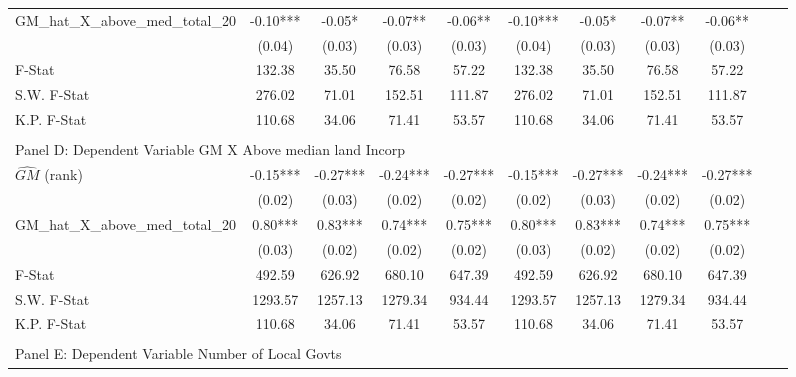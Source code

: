 \begin{table}[htbp]
\begin{threeparttable}
\begin{tabular}{l*{10}{c}}
\addlinespace
GM\_hat\_X\_above\_med\_total\_20&      -0.10***&      -0.05*  &      -0.07** &      -0.06** &      -0.10***&      -0.05*  &      -0.07** &      -0.06** \\
                &     (0.04)   &     (0.03)   &     (0.03)   &     (0.03)   &     (0.04)   &     (0.03)   &     (0.03)   &     (0.03)   \\
\midrule
F-Stat          &     132.38   &      35.50   &      76.58   &      57.22   &     132.38   &      35.50   &      76.58   &      57.22   \\
S.W. F-Stat     &     276.02   &      71.01   &     152.51   &     111.87   &     276.02   &      71.01   &     152.51   &     111.87   \\
K.P. F-Stat     &     110.68   &      34.06   &      71.41   &      53.57   &     110.68   &      34.06   &      71.41   &      53.57   \\
\cmidrule[\heavyrulewidth](lr){1-9} \\ \cmidrule[\heavyrulewidth](lr){1-9}
\multicolumn{8}{l}{Panel D: Dependent Variable GM X Above median land Incorp}\\
\cmidrule(lr){1-9}
$\hat{GM}$ (rank)&      -0.15***&      -0.27***&      -0.24***&      -0.27***&      -0.15***&      -0.27***&      -0.24***&      -0.27***\\
                &     (0.02)   &     (0.03)   &     (0.02)   &     (0.02)   &     (0.02)   &     (0.03)   &     (0.02)   &     (0.02)   \\
\addlinespace
GM\_hat\_X\_above\_med\_total\_20&       0.80***&       0.83***&       0.74***&       0.75***&       0.80***&       0.83***&       0.74***&       0.75***\\
                &     (0.03)   &     (0.02)   &     (0.02)   &     (0.02)   &     (0.03)   &     (0.02)   &     (0.02)   &     (0.02)   \\
\midrule
F-Stat          &     492.59   &     626.92   &     680.10   &     647.39   &     492.59   &     626.92   &     680.10   &     647.39   \\
S.W. F-Stat     &    1293.57   &    1257.13   &    1279.34   &     934.44   &    1293.57   &    1257.13   &    1279.34   &     934.44   \\
K.P. F-Stat     &     110.68   &      34.06   &      71.41   &      53.57   &     110.68   &      34.06   &      71.41   &      53.57   \\
\cmidrule[\heavyrulewidth](lr){1-9} \\ \cmidrule[\heavyrulewidth](lr){1-9}
\multicolumn{8}{l}{Panel E: Dependent Variable Number of Local Govts}\\

\end{tabular}
\end{threeparttable}
\end{table}

